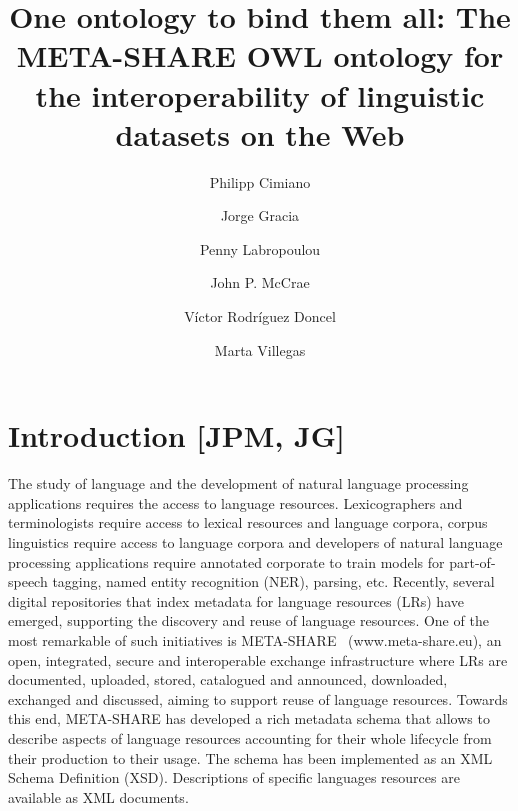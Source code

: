 \documentclass{llncs}
\begin{document}
\title{One ontology to bind them all: The META-SHARE OWL ontology for the interoperability of linguistic datasets on the Web}
%
%
\author{Philipp Cimiano \and Jorge Gracia \and Penny Labropoulou \and John P. McCrae \and V\'ictor Rodr\'iguez Doncel \and Marta Villegas}
%
%
%
\maketitle %
\begin{abstract}
\end{abstract}


\section{Introduction [JPM, JG]}
\label{sec:introduction}

The study of language and the development of natural language processing applications requires the access to language resources. Lexicographers and terminologists require access to lexical resources and language corpora, corpus linguistics require access to language corpora and developers of natural language processing applications require annotated corporate to train models for part-of-speech tagging, named entity recognition (NER), parsing, etc. 
Recently, several digital repositories that index metadata for language resources (LRs) have emerged, supporting the discovery and reuse of language resources. One of the most remarkable of such initiatives is META-SHARE~\cite{piperidis2012meta} (www.meta-share.eu), an open, integrated, secure and interoperable exchange infrastructure where LRs are documented, uploaded, stored, catalogued and announced, downloaded, exchanged and discussed, aiming to support reuse of language resources. Towards this end, META-SHARE has developed a rich metadata schema that allows to describe aspects of language resources accounting for their whole lifecycle from their production to their usage. The schema has been implemented as an XML Schema Definition (XSD). Descriptions of specific languages resources are available as XML documents.
\end{document}
